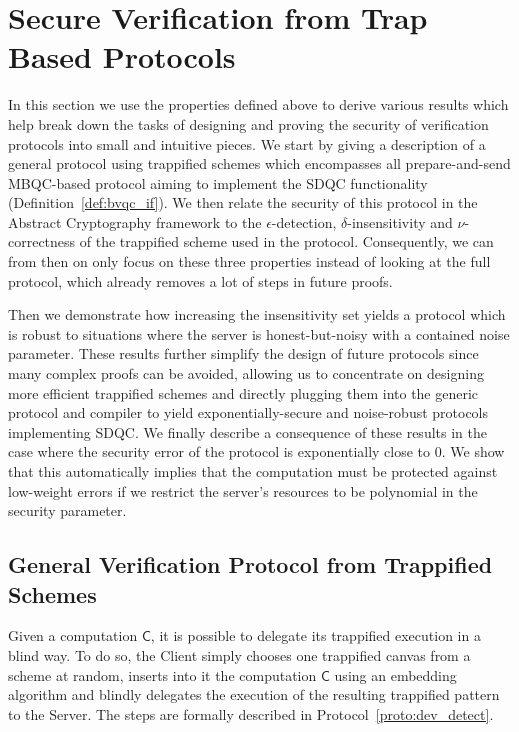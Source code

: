 \documentclass[12pt]{iopart}
\newcommand{\cptp}[1]{\mathsf{#1}} \newcommand{\pd}[1]{\mathcal{#1}}  \newcommand{\sch}[1]{\bm{#1}}
\renewcommand{\1}{\mathds{1}}
\begin{document}
\section{Secure Verification from Trap Based Protocols}
\label{sec:verif}
In this section we use the properties defined above to derive various results which help break down the tasks of designing and proving the security of verification protocols into small and intuitive pieces. We start by giving a description of a general protocol using trappified schemes which encompasses all prepare-and-send MBQC-based protocol aiming to implement the SDQC functionality (Definition~\ref{def:bvqc_if}). We then relate the security of this protocol in the Abstract Cryptography framework to the $\epsilon$-detection, $\delta$-insensitivity and $\nu$-correctness of the trappified scheme used in the protocol. Consequently, we can from then on only focus on these three properties instead of looking at the full protocol, which already removes a lot of steps in future proofs.

Then we demonstrate how increasing the insensitivity set yields a protocol which is robust to situations where the server is honest-but-noisy with a contained noise parameter. These results further simplify the design of future protocols since many complex proofs can be avoided, allowing us to concentrate on designing more efficient trappified schemes and directly plugging them into the generic protocol and compiler to yield exponentially-secure and noise-robust protocols implementing SDQC.
We finally describe a consequence of these results in the case where the security error of the protocol is exponentially close to $0$. We show that this automatically implies that the computation must be protected against low-weight errors if we restrict the server's resources to be polynomial in the security parameter.

\subsection{General Verification Protocol from Trappified Schemes}
Given a computation $\cptp C$, it is possible to delegate its trappified execution in a blind way. To do so, the Client simply chooses one trappified canvas from a scheme at random, inserts into it the computation $\cptp C$ using an embedding algorithm and blindly delegates the execution of the resulting trappified pattern to the Server. The steps are formally described in Protocol~\ref{proto:dev_detect}.
\end{document}
